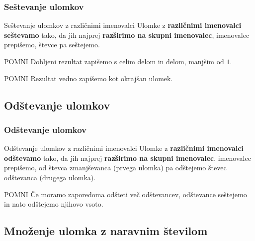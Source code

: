         \begin{frame}[t]
            \frametitle{Seštevanje ulomkov}

            \begin{alertblock}{Seštevanje ulomkov z različnimi imenovalci}
                Ulomke z \textbf{različnimi imenovalci seštevamo} tako, da jih najprej \textbf{razširimo na skupni imenovalec}, imenovalec prepišemo, števce pa seštejemo.
            \end{alertblock}

            \begin{block}{POMNI}
                Dobljeni rezultat zapišemo s celim delom in delom, manjšim od $1$.
            \end{block}

            \begin{block}{POMNI}
                Rezultat vedno zapišemo kot okrajšan ulomek.
            \end{block}

        \end{frame}

    \subsection{Odštevanje ulomkov}

        \begin{frame}[t]
            \frametitle{Odštevanje ulomkov}

            \begin{alertblock}{Odštevanje ulomkov z različnimi imenovalci}
                Ulomke z \textbf{različnimi imenovalci odštevamo} tako, da jih najprej \textbf{razširimo na skupni imenovalec}, imenovalec prepišemo, od števca zmanjševanca (prvega ulomka) pa odštejemo števec odštevanca (drugega ulomka). 
            \end{alertblock}

            \begin{block}{POMNI}
                Če moramo zaporedoma odšteti več odštevancev, odštevance seštejemo in nato odštejemo njihovo vsoto.
            \end{block}

        \end{frame}

    \subsection{Množenje ulomka z naravnim številom}

